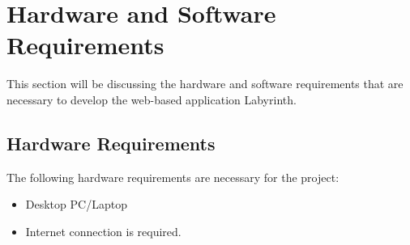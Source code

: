 \documentclass{FastFyp}
\begin{document}
\FloatBarrier
\section{Hardware and Software Requirements}
This section will be discussing the hardware and software requirements that are necessary to develop the web-based application Labyrinth.
\subsection{Hardware Requirements}
The following hardware requirements are necessary for the project:
\begin{itemize}
    \item Desktop PC/Laptop
    \item Internet connection is required.
\end{itemize}
\end{document}
